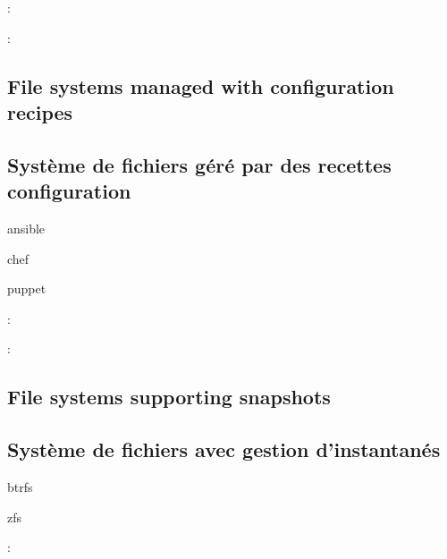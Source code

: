 :
\begin{itmz}
\item{\ml{\todo}
{\todo}}
\end{itmz}

:
\begin{itmz}
\item{\ml{\todo}
{\todo}}
\end{itmz}

\ml
{\subsection{File systems managed with configuration recipes}}
{\subsection{Système de fichiers géré par des recettes configuration}}

\begin{itmz}
\item{ansible}
\item{chef}
\item{puppet}
\end{itmz}

:
\begin{itmz}
\item{\ml{\todo}
{\todo}}
\end{itmz}

:
\begin{itmz}
\item{\ml{\todo}
{\todo}}
\end{itmz}

\ml
{\subsection{File systems supporting snapshots}}
{\subsection{Système de fichiers avec gestion d’instantanés}}

\begin{itmz}
\item{btrfs}
\item{zfs}
\end{itmz}

:
\begin{itmz}
\item{\ml{\todo}
{\todo}}
\end{itmz}

